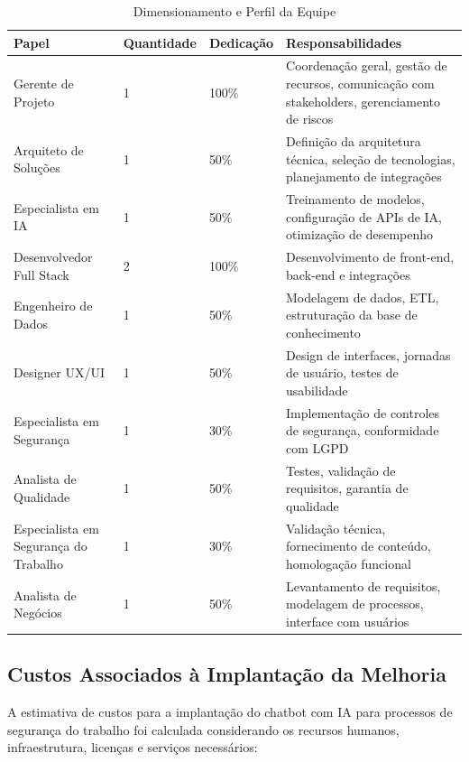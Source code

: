 \documentclass[12pt,a4paper]{article}
\renewcommand{\arraystretch}{1.2}
\begin{document}
\begin{table}[H]
\centering
\begin{adjustbox}{max width=\textwidth}
\renewcommand{\arraystretch}{1.2}
\begin{tabular}{|p{3cm}|p{3cm}|p{3cm}|p{6cm}|}
\hline
\rowcolor{gray!20}
\textbf{Papel} & \textbf{Quantidade} & \textbf{Dedicação} & \textbf{Responsabilidades} \\
\hline
Gerente de Projeto & 1 & 100\% & Coordenação geral, gestão de recursos, comunicação com stakeholders, gerenciamento de riscos \\
\hline
Arquiteto de Soluções & 1 & 50\% & Definição da arquitetura técnica, seleção de tecnologias, planejamento de integrações \\
\hline
Especialista em IA & 1 & 50\% & Treinamento de modelos, configuração de APIs de IA, otimização de desempenho \\
\hline
Desenvolvedor Full Stack & 2 & 100\% & Desenvolvimento de front-end, back-end e integrações \\
\hline
Engenheiro de Dados & 1 & 50\% & Modelagem de dados, ETL, estruturação da base de conhecimento \\
\hline
Designer UX/UI & 1 & 50\% & Design de interfaces, jornadas de usuário, testes de usabilidade \\
\hline
Especialista em Segurança & 1 & 30\% & Implementação de controles de segurança, conformidade com LGPD \\
\hline
Analista de Qualidade & 1 & 50\% & Testes, validação de requisitos, garantia de qualidade \\
\hline
Especialista em Segurança do Trabalho & 1 & 30\% & Validação técnica, fornecimento de conteúdo, homologação funcional \\
\hline
Analista de Negócios & 1 & 50\% & Levantamento de requisitos, modelagem de processos, interface com usuários \\
\hline
\end{tabular}
\end{adjustbox}
\caption{Dimensionamento e Perfil da Equipe}
\end{table}

\subsection{Custos Associados à Implantação da Melhoria}

A estimativa de custos para a implantação do chatbot com IA para processos de segurança do trabalho foi calculada considerando os recursos humanos, infraestrutura, licenças e serviços necessários:
\end{document}
